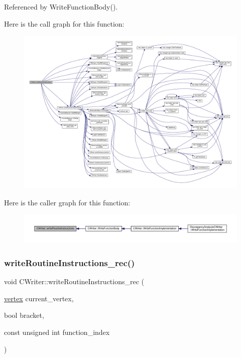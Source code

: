 Referenced by Write\+Function\+Body().

Here is the call graph for this function\+:
\nopagebreak
\begin{figure}[H]
\begin{center}
\leavevmode
\includegraphics[width=350pt]{d3/d59/classCWriter_a7810dd571d72debb400b889f8366848a_cgraph}
\end{center}
\end{figure}
Here is the caller graph for this function\+:
\nopagebreak
\begin{figure}[H]
\begin{center}
\leavevmode
\includegraphics[width=350pt]{d3/d59/classCWriter_a7810dd571d72debb400b889f8366848a_icgraph}
\end{center}
\end{figure}
\mbox{\label{classCWriter_a10d0233fea0a92085a3aa160b9e39845}} 
\subsubsection{\texorpdfstring{write\+Routine\+Instructions\+\_\+rec()}{writeRoutineInstructions\_rec()}}
{\footnotesize\ttfamily void C\+Writer\+::write\+Routine\+Instructions\+\_\+rec (\begin{DoxyParamCaption}\item[{\hyperlink{graph_8hpp_abefdcf0544e601805af44eca032cca14}{vertex}}]{current\+\_\+vertex,  }\item[{bool}]{bracket,  }\item[{const unsigned int}]{function\+\_\+index }\end{DoxyParamCaption})\hspace{0.3cm}{\ttfamily [protected]}}



